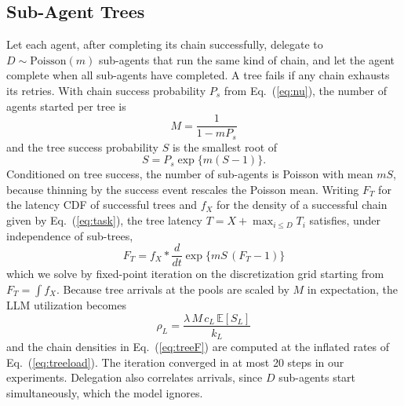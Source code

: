 \documentclass[journal]{IEEEtran}
\newcommand{\E}{\mathbb{E}}
\begin{document}
\subsection{Sub-Agent Trees}\label{sec:tree}
Let each agent, after completing its chain successfully, delegate to $D\sim\mathrm{Poisson}(m)$ sub-agents that run the same kind of chain, and let the agent complete when all sub-agents have completed. A tree fails if any chain exhausts its retries. With chain success probability $P_s$ from Eq.~(\ref{eq:nu}), the number of agents started per tree is
\begin{equation}M=\frac{1}{1-mP_s}\label{eq:agents}\end{equation}
and the tree success probability $S$ is the smallest root of
\begin{equation}S=P_s\exp\{m(S-1)\}.\label{eq:treesucc}\end{equation}
Conditioned on tree success, the number of sub-agents is Poisson with mean $mS$, because thinning by the success event rescales the Poisson mean. Writing $F_T$ for the latency CDF of successful trees and $f_X$ for the density of a successful chain given by Eq.~(\ref{eq:task}), the tree latency $T=X+\max_{i\le D}T_i$ satisfies, under independence of sub-trees,
\begin{equation}F_T=f_X\ast\frac{d}{dt}\exp\{mS\,(F_T-1)\}\label{eq:treeF}\end{equation}
which we solve by fixed-point iteration on the discretization grid starting from $F_T=\int f_X$. Because tree arrivals at the pools are scaled by $M$ in expectation, the LLM utilization becomes
\begin{equation}\rho_L=\frac{\lambda\,M\,c_L\,\E[S_L]}{k_L}\label{eq:treeload}\end{equation}
and the chain densities in Eq.~(\ref{eq:treeF}) are computed at the inflated rates of Eq.~(\ref{eq:treeload}). The iteration converged in at most 20 steps in our experiments. Delegation also correlates arrivals, since $D$ sub-agents start simultaneously, which the model ignores.
\end{document}
